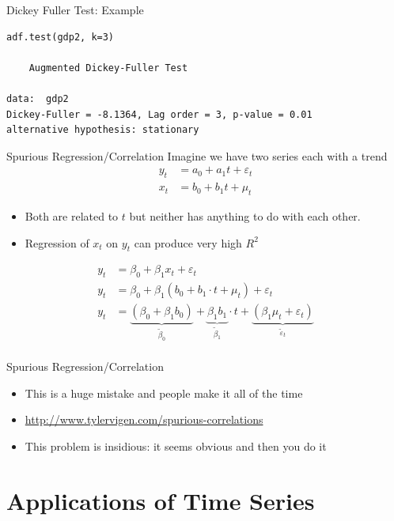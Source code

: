 \begin{frame}[fragile]{Dickey Fuller Test: Example}
\small
\begin{verbatim}
adf.test(gdp2, k=3)

    Augmented Dickey-Fuller Test

data:  gdp2
Dickey-Fuller = -8.1364, Lag order = 3, p-value = 0.01
alternative hypothesis: stationary
\end{verbatim}
\end{frame}


\begin{frame}{Spurious Regression/Correlation}
Imagine we have two series each with a trend
\begin{align*}
y_{t} &= a_0 + a_1 t + \varepsilon_{t}\\
x_{t} &= b_0 + b_1 t + \mu_{t}
\end{align*}
\begin{itemize}
    \item Both are related to $t$ but neither has anything to do with each other.
    \item Regression of $x_t$ on $y_t$ can produce very high $R^2$
\end{itemize}
\begin{align*}
y_{t} &= \beta_0  + \beta_1 x_{t} + \varepsilon_t\\
y_{t} &= \beta_0  + \beta_1 (b_0 + b_1 \cdot t + \mu_t) + \varepsilon_t\\
y_{t} &= \underbrace{(\beta_0  + \beta_1 b_0)}_{\widetilde{\beta}_0}  + \underbrace{\beta_1 b_1}_{\widetilde{\beta}_1} \cdot t + \underbrace{(\beta_1 \mu_t+ \varepsilon_t)}_{\widetilde{\varepsilon}_t}\\
\end{align*}
\end{frame}

\begin{frame}{Spurious Regression/Correlation}
\begin{itemize}
\item This is a \alert{huge mistake} and people make it all of the time
\item \url{http://www.tylervigen.com/spurious-correlations}
\item This problem is insidious: it seems obvious and then you do it
\end{itemize}
\end{frame}


\section{Applications of Time Series}

